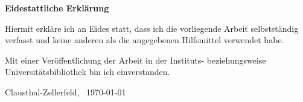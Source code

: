 \makeatletter

\cleardoublepage

\thispagestyle{empty}
\hskip 0mm
\vfill

\begin{center}
    \sffamily\bfseries\large Eidestattliche Erklärung
\end{center}

\bigskip\noindent Hiermit erkläre ich an Eides statt, dass ich die vorliegende Arbeit selbstständig verfasst und keine anderen als die angegebenen Hilfsmittel verwendet habe.\par
Mit einer Veröffentlichung der Arbeit in der Instituts- beziehungsweise Universitätsbibliothek bin ich einverstanden.\par

\bigskip\noindent Clausthal-Zellerfeld,~ \today\par
\vskip 10mm
\hfill \hrulefill
\makeatother